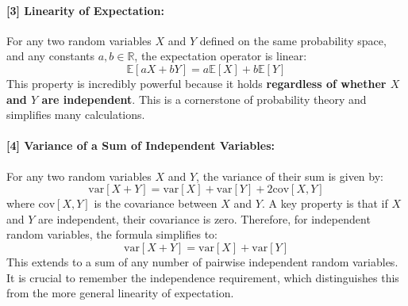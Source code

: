 \documentclass[11pt,a4paper]{article}
\theoremstyle{named}
\begin{document}
\label{note:3}
\paragraph{[3] Linearity of Expectation:}
For any two random variables $X$ and $Y$ defined on the same probability space, and any constants $a, b \in \mathbb{R}$, the expectation operator is linear:
\[
\mathbb{E}[aX + bY] = a\mathbb{E}[X] + b\mathbb{E}[Y]
\]
This property is incredibly powerful because it holds \textbf{regardless of whether $X$ and $Y$ are independent}. This is a cornerstone of probability theory and simplifies many calculations.

\label{note:4}
\paragraph{[4] Variance of a Sum of Independent Variables:}
For any two random variables $X$ and $Y$, the variance of their sum is given by:
\[
\text{var}[X+Y] = \text{var}[X] + \text{var}[Y] + 2\text{cov}[X,Y]
\]
where $\text{cov}[X,Y]$ is the covariance between $X$ and $Y$. A key property is that if $X$ and $Y$ are independent, their covariance is zero. Therefore, for independent random variables, the formula simplifies to:
\[
\text{var}[X+Y] = \text{var}[X] + \text{var}[Y]
\]
This extends to a sum of any number of pairwise independent random variables. It is crucial to remember the independence requirement, which distinguishes this from the more general linearity of expectation.
\end{document}
